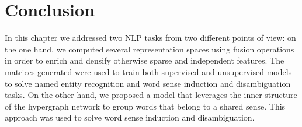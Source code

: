%
%
%






\section{Conclusion}
\label{chap6:conclusion}
In this chapter we addressed two NLP tasks from two different points of view: on the one hand, we computed several representation spaces using fusion operations in order to enrich and densify otherwise sparse and independent features. The matrices generated were used to train both supervised and unsupervised models to solve named entity recognition and word sense induction and disambiguation tasks. On the other hand, we proposed a model that leverages the inner structure of the hypergraph network to group words that belong to a shared sense. This approach was used to solve word sense induction and disambiguation.

